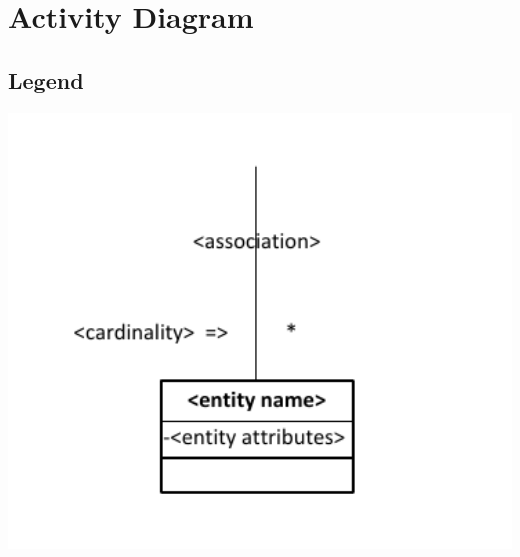 \documentclass{article}
\begin{document}
\section{Activity Diagram}
\subsection{Legend}
\includegraphics[keepaspectratio, width=6in]{domain_model_legend.pdf}\\
\end{document}
